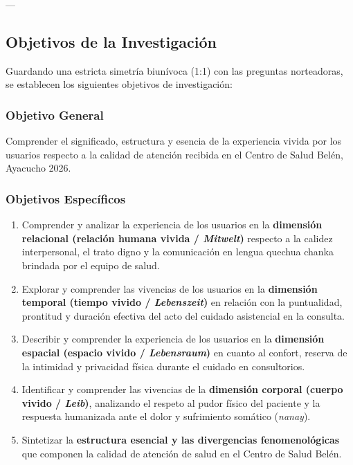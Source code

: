 ---

\subsection{Objetivos de la Investigación}
\label{sec:1.3_objetivos}

Guardando una estricta simetría biunívoca (1:1) con las preguntas norteadoras, se establecen los siguientes objetivos de investigación:

\subsubsection{Objetivo General}
\label{sec:1.3.1_obj_gral}
Comprender el significado, estructura y esencia de la experiencia vivida por los usuarios respecto a la calidad de atención recibida en el Centro de Salud Belén, Ayacucho 2026.

\subsubsection{Objetivos Específicos}
\label{sec:1.3.2_obj_esp}
\begin{enumerate}
    \item Comprender y analizar la experiencia de los usuarios en la \textbf{dimensión relacional (relación humana vivida / \textit{Mitwelt})} respecto a la calidez interpersonal, el trato digno y la comunicación en lengua quechua chanka brindada por el equipo de salud.
    \item Explorar y comprender las vivencias de los usuarios en la \textbf{dimensión temporal (tiempo vivido / \textit{Lebenszeit})} en relación con la puntualidad, prontitud y duración efectiva del acto del cuidado asistencial en la consulta.
    \item Describir y comprender la experiencia de los usuarios en la \textbf{dimensión espacial (espacio vivido / \textit{Lebensraum})} en cuanto al confort, reserva de la intimidad y privacidad física durante el cuidado en consultorios.
    \item Identificar y comprender las vivencias de la \textbf{dimensión corporal (cuerpo vivido / \textit{Leib})}, analizando el respeto al pudor físico del paciente y la respuesta humanizada ante el dolor y sufrimiento somático (\textit{nanay}).
    \item Sintetizar la \textbf{estructura esencial y las divergencias fenomenológicas} que componen la calidad de atención de salud en el Centro de Salud Belén.
\end{enumerate}


